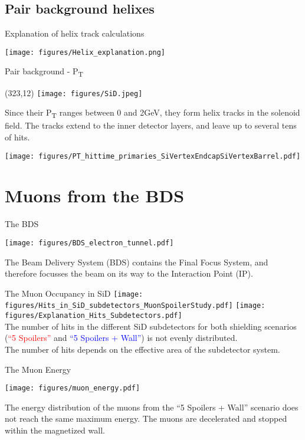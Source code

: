 \documentclass[xcolor={dvipsnames}]{beamer}
\newcommand{\sidlogo}{
  \setlength{\TPHorizModule}{1pt}
  \setlength{\TPVertModule}{1pt}
  \begin{textblock}{1}(323,12)
   \texttt{[image: figures/SiD.jpeg]}
  \end{textblock}
  }
\begin{document}
\subsection{Pair background helixes}
\begin{frame}{Explanation of helix track calculations}
 \begin{center}
  \texttt{[image: figures/Helix\_explanation.png]}
\end{center}
\end{frame}
\begin{frame}{Pair background -  P\textsubscript{T}}
\sidlogo
Since their P\textsubscript{T} ranges between 0 and 2GeV, they form helix tracks in the solenoid field. The tracks extend to the inner detector layers, and leave up to several tens of hits.
\begin{center}
\texttt{[image: figures/PT\_hittime\_primaries\_SiVertexEndcapSiVertexBarrel.pdf]}
\end{center}
\end{frame}


\section{Muons from the BDS}
\begin{frame}{The BDS}
\begin{center}
  \texttt{[image: figures/BDS\_electron\_tunnel.pdf]}
  \end{center}
The Beam Delivery System (BDS) contains the Final Focus System, and therefore focusses the beam on its way to the Interaction Point (IP).
\end{frame}

\begin{frame}{The Muon Occupancy in SiD}
 \texttt{[image: figures/Hits\_in\_SiD\_subdetectors\_MuonSpoilerStudy.pdf]}
  \texttt{[image: figures/Explanation\_Hits\_Subdetectors.pdf]}\\
The number of hits in the different SiD subdetectors for both shielding scenarios (\textcolor{Red}{``5 Spoilers''} and \textcolor{Blue}{``5 Spoilers + Wall''}) is not evenly distributed.\\
The number of hits depends on the effective area of the subdetector system.
 \end{frame}
 
\begin{frame}{The Muon Energy}
\begin{center}
  \texttt{[image: figures/muon\_energy.pdf]}
\end{center}
The energy distribution of the muons from the ``5 Spoilers + Wall'' scenario does not reach the same maximum energy. The muons are decelerated and stopped within the magnetized wall.
\end{frame}
\end{document}
